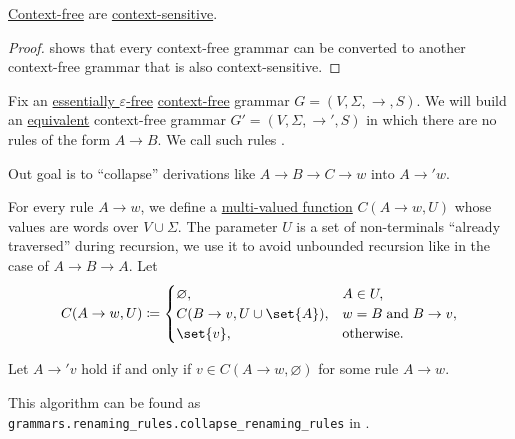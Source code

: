 \begin{proposition}\label{thm:context_free_languages_are_conext_sensitive}
  \hyperref[def:chomsky_hierarchy/context_free]{Context-free}  are \hyperref[def:chomsky_hierarchy/context_sensitive]{context-sensitive}.
\end{proposition}
\begin{proof}
   shows that every context-free grammar can be converted to another context-free grammar that is also context-sensitive.
\end{proof}

\begin{algorithm}\label{alg:renaming_rule_collapse}
  Fix an \hyperref[def:epsilon_free_grammar]{essentially \( \varepsilon \)-free} \hyperref[def:chomsky_hierarchy/context_free]{context-free} grammar \( G = (V, \Sigma, \to, S) \). We will build an \hyperref[def:formal_grammar/equivalent]{equivalent} context-free grammar \( G' = (V, \Sigma, \to', S) \) in which there are no rules of the form \( A \to B \). We call such rules .

  Out goal is to \enquote{collapse} derivations like \( A \to B \to C \to w \) into \( A \to' w \).

  \begin{thmenum}
     For every rule \( A \to w \), we define a \hyperref[def:multi_valued_function]{multi-valued function} \( C(A \to w, U) \) whose values are words over \( V \cup \Sigma \). The parameter \( U \) is a set of non-terminals \enquote{already traversed} during recursion, we use it to avoid unbounded recursion like in the case of \( A \to B \to A \). Let
    \begin{equation*}
      C(A \to w, U) \coloneqq \begin{cases}
        \varnothing,                  &A \in U, \\
        C(B \to v, U \cup \set{ A }), &w = B \T{and} B \to v, \\
        \set{ v },                    &\T{otherwise.}
      \end{cases}
    \end{equation*}

     Let \( A \to' v \) hold if and only if \( v \in C(A \to w, \varnothing) \) for some rule \( A \to w \).
  \end{thmenum}
\end{algorithm}
\begin{comments}
  \item This algorithm can be found as \texttt{grammars.renaming\_rules.collapse\_renaming\_rules} in \cite{code}.
\end{comments}

